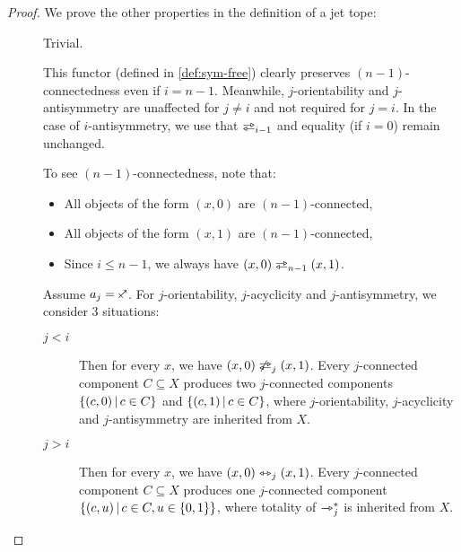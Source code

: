 \documentclass[a4paper]{memoir}
\begin{document}
\begin{proof}
	We prove the other properties in the definition of a jet tope:
	\begin{description}
		\item[] Trivial.
		\item[] This functor (defined in \cref{def:sym-free}) clearly preserves $(n-1)$-connectedness even if $i = n-1$.
		Meanwhile, $j$-orientability and $j$-antisymmetry are unaffected for $j \neq i$ and not required for $j = i$.
		In the case of $i$-antisymmetry, we use that $\infrajetsym_{i-1}$ and equality (if $i = 0$) remain unchanged.
		\item[] To see $(n-1)$-connectedness, note that:
		\begin{itemize}
			\item All objects of the form $(x, 0)$ are $(n-1)$-connected,
			\item All objects of the form $(x, 1)$ are $(n-1)$-connected,
			\item Since $i \leq n-1$, we always have $(x, 0) \infrajet_{n-1} (x, 1)$.
		\end{itemize}
		Assume $a_j = \ypolar$. For $j$-orientability, $j$-acyclicity and $j$-antisymmetry, we consider 3 situations:
		\begin{description}
			\item[$j < i$] Then for every $x$, we have $(x, 0) \not\infrajet_j (x, 1)$. Every $j$-connected component $C \subseteq X$ produces two $j$-connected components $\mathopen{}\left\{ (c, 0) \,\middle|\, c \in C \right\}\mathclose{}$ and $\mathopen{}\left\{ (c, 1) \,\middle|\, c \in C \right\}\mathclose{}$, where $j$-orientability, $j$-acyclicity and $j$-antisymmetry are inherited from $X$.
			\item[$j > i$] Then for every $x$, we have $(x, 0) \leftrightarrowtriangle_j (x, 1)$. Every $j$-connected component $C \subseteq X$ produces one $j$-connected component $\mathopen{}\left\{ (c, u) \,\middle|\, c \in C, u \in \mathopen{}\left\{ 0, 1 \right\}\mathclose{} \right\}\mathclose{}$, where totality of $\rightarrowtriangle_j^*$ is inherited from $X$.
			

\end{description}
\end{description}
\end{proof}
\end{document}
